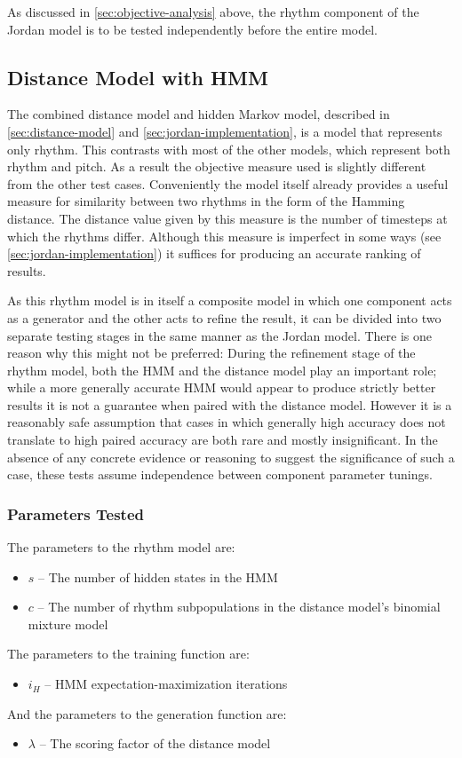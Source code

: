 \documentclass[ author={Stephen Livermore-Tozer},
				supervisor={Dr. Peter Flach},
				degree={MEng},
				title={Algorithmic Co-composition Using Machine Learning},
				subtitle={},
				type={research},
				year={2016} ]{dissertation}
\begin{document}
	As discussed in \ref{sec:objective-analysis} above, the rhythm component of the Jordan model is to be tested independently before the entire model.
	
	\subsection{Distance Model with HMM}

	The combined distance model and hidden Markov model, described in \ref{sec:distance-model} and \ref{sec:jordan-implementation}, is a model that represents only rhythm. This contrasts with most of the other models, which represent both rhythm and pitch. As a result the objective measure used is slightly different from the other test cases. Conveniently the model itself already provides a useful measure for similarity between two rhythms in the form of the Hamming distance. The distance value given by this measure is the number of timesteps at which the rhythms differ. Although this measure is imperfect in some ways (see \ref{sec:jordan-implementation}) it suffices for producing an accurate ranking of results.
	
	As this rhythm model is in itself a composite model in which one component acts as a generator and the other acts to refine the result, it can be divided into two separate testing stages in the same manner as the Jordan model. There is one reason why this might not be preferred: During the refinement stage of the rhythm model, both the HMM and the distance model play an important role; while a more generally accurate HMM would appear to produce strictly better results it is not a guarantee when paired with the distance model. However it is a reasonably safe assumption that cases in which generally high accuracy does not translate to high paired accuracy are both rare and mostly insignificant. In the absence of any concrete evidence or reasoning to suggest the significance of such a case, these tests assume independence between component parameter tunings.
	
	\subsubsection{Parameters Tested}
	
	The parameters to the rhythm model are:
	\begin{itemize}
		\item $s$ -- The number of hidden states in the HMM
		\item $c$ -- The number of rhythm subpopulations in the distance model's binomial mixture model
	\end{itemize}
	The parameters to the training function are:
	\begin{itemize}
		\item $i_H$ -- HMM expectation-maximization iterations
	\end{itemize}
	And the parameters to the generation function are:
	\begin{itemize}
		\item $\lambda$ -- The scoring factor of the distance model
	\end{itemize}
	
\end{document}
